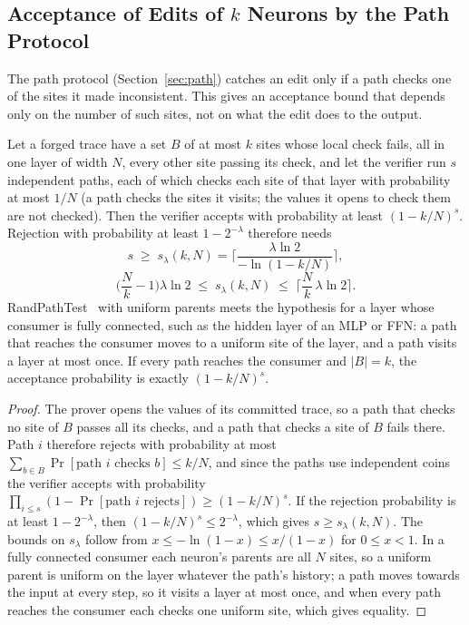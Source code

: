 \subsection{Acceptance of Edits of \texorpdfstring{$k$}{k} Neurons by the Path Protocol}
\label{app:paths}

The path protocol (Section~\ref{sec:path}) catches an edit only if a path checks one of the sites it
made inconsistent. This gives an acceptance bound that depends only on the number of such sites,
not on what the edit does to the output.

\begin{proposition}
\label{prop:paths}
Let a forged trace have a set $B$ of at most $k$ sites whose local check fails, all in one layer of
width $N$, every other site passing its check, and let the verifier run $s$ independent paths, each of
which checks each site of that layer with probability at most $1/N$ (a path checks the sites it visits;
the values it opens to check them are not checked). Then the verifier accepts with
probability at least $(1-k/N)^s$. Rejection with probability at least $1-2^{-\lambda}$ therefore needs
\[
  s\;\ge\;s_\lambda(k,N)=\Big\lceil\frac{\lambda\ln2}{-\ln(1-k/N)}\Big\rceil,
\]
\[
  \Big(\frac Nk-1\Big)\lambda\ln2\;\le\;s_\lambda(k,N)\;\le\;\Big\lceil\frac Nk\,\lambda\ln2\Big\rceil.
\]
RandPathTest~\cite{anchuri2026verifiable} with uniform parents meets the hypothesis for a layer whose
consumer is fully connected, such as the hidden layer of an MLP or FFN: a path that reaches the
consumer moves to a uniform site of the layer, and a path visits a layer at most once. If every path
reaches the consumer and $|B|=k$, the acceptance probability is exactly $(1-k/N)^s$.
\end{proposition}

\begin{proof}
The prover opens the values of its committed trace, so a path that checks no site of $B$ passes all
its checks, and a path that checks a site of $B$ fails there. Path $i$ therefore rejects with
probability at most $\sum_{b\in B}\Pr[\text{path $i$ checks $b$}]\le k/N$, and since the paths use
independent coins the verifier accepts with probability
$\prod_{i\le s}(1-\Pr[\text{path $i$ rejects}])\ge(1-k/N)^s$. If the rejection probability is at least
$1-2^{-\lambda}$, then $(1-k/N)^s\le2^{-\lambda}$, which gives $s\ge s_\lambda(k,N)$. The bounds on
$s_\lambda$ follow from $x\le-\ln(1-x)\le x/(1-x)$ for $0\le x<1$. In a fully connected consumer each
neuron's parents are all $N$ sites, so a uniform parent is uniform on the layer whatever the path's
history; a path moves towards the input at every step, so it visits a layer at most once, and when
every path reaches the consumer each checks one uniform site, which gives equality.
\end{proof}

